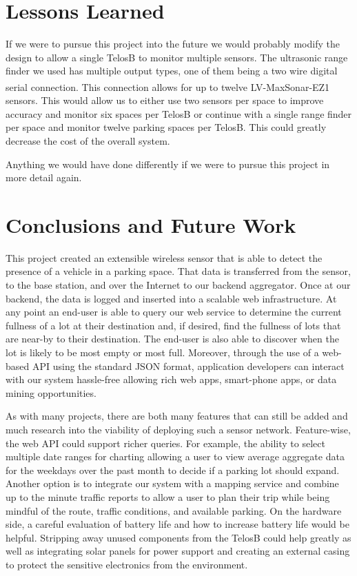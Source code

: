 \documentclass{acm_proc}
\begin{document}
\section{Lessons Learned}\label{sec:lessons}

If we were to pursue this project into the future we would probably modify the design to allow a single TelosB to monitor multiple sensors.  The ultrasonic range finder we used has multiple output types, one of them being a two wire digital serial connection.  This connection allows for up to twelve LV-MaxSonar\textsuperscript{\textregistered}-EZ1\textsuperscript{\texttrademark} sensors.  This would allow us to either use two sensors per space to improve accuracy and monitor six spaces per TelosB or continue with a single range finder per space and monitor twelve parking spaces per TelosB.  This could greatly decrease the cost of the overall system.

Anything we would have done differently if we were to pursue this project
in more detail again.

\section{Conclusions and Future Work}\label{sec:conclusions}

This project created an extensible wireless sensor that is able to detect
the presence of a vehicle in a parking space.
That data is transferred from the sensor, to the base station, and over the
Internet to our backend aggregator.
Once at our backend, the data is logged and inserted into a scalable web
infrastructure.
At any point an end-user is able to query our web service to determine the
current fullness of a lot at their destination and, if desired, find the
fullness of lots that are near-by to their destination.
The end-user is also able to discover when the lot is likely to be most
empty or most full.
Moreover, through the use of a web-based API using the standard JSON
format, application developers can interact with our system hassle-free
allowing rich web apps, smart-phone apps, or data mining opportunities.

As with many projects, there are both many features that can still be added
and much research into the viability of deploying such a sensor network.
Feature-wise, the web API could support richer queries.
For example, the ability to select multiple date ranges for charting
allowing a user to view average aggregate data for the weekdays over the
past month to decide if a parking lot should expand.
Another option is to integrate our system with a mapping service and
combine up to the minute traffic reports to allow a user to plan their trip
while being mindful of the route, traffic conditions, and available
parking.
On the hardware side, a careful evaluation of battery life and how to
increase battery life would be helpful.
Stripping away unused components from the TelosB could help greatly as well
as integrating solar panels for power support and creating an external
casing to protect the sensitive electronics from the environment.



\end{document}
